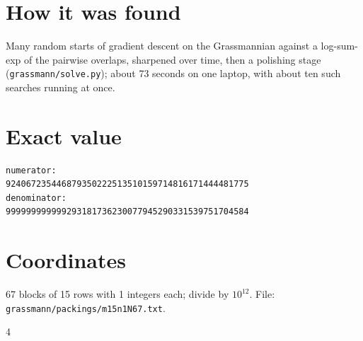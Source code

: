 \documentclass[11pt,a4paper]{article}
\begin{document}
\section{How it was found}
Many random starts of gradient descent on the Grassmannian against a log-sum-exp of the pairwise overlaps, sharpened over time, then a polishing stage (\texttt{grassmann/solve.py}); about 73 seconds on one laptop, with about ten such searches running at once.


\appendix
\section{Exact value}
{\small
\begin{verbatim}
numerator:
924067235446879350222513510159714816171444481775
denominator:
999999999999293181736230077945290331539751704584
\end{verbatim}}

\section{Coordinates}
67 blocks of 15 rows with 1 integers each; divide by $10^{12}$. File: \texttt{grassmann/packings/m15n1N67.txt}.
{\tiny
\begin{multicols}{4}
\end{multicols}}
\end{document}
